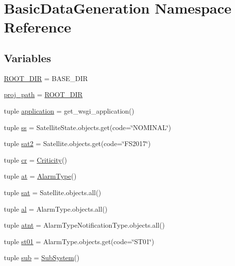 \hypertarget{namespace_basic_data_generation}{}\section{Basic\+Data\+Generation Namespace Reference}
\label{namespace_basic_data_generation}
\subsection*{Variables}
\begin{DoxyCompactItemize}
\item 
\hyperlink{namespace_basic_data_generation_ac7a32de6b13ab8024bb25d34167992a2}{R\+O\+O\+T\+\_\+\+D\+I\+R} = B\+A\+S\+E\+\_\+\+D\+I\+R
\item 
\hyperlink{namespace_basic_data_generation_aba88e6c9fac18290407d6547357b533f}{proj\+\_\+path} = \hyperlink{namespace_basic_data_generation_ac7a32de6b13ab8024bb25d34167992a2}{R\+O\+O\+T\+\_\+\+D\+I\+R}
\item 
tuple \hyperlink{namespace_basic_data_generation_ae5f818e308cadb95df893ff136a20bb1}{application} = get\+\_\+wsgi\+\_\+application()
\item 
tuple \hyperlink{namespace_basic_data_generation_a9429db321b2f5b7b76b129c7cedc9631}{ss} = Satellite\+State.\+objects.\+get(code=\char`\"{}N\+O\+M\+I\+N\+A\+L\char`\"{})
\item 
tuple \hyperlink{namespace_basic_data_generation_a2a7c0a3f11368b069b40d2b26ddfbba5}{sat2} = Satellite.\+objects.\+get(code=\char`\"{}F\+S2017\char`\"{})
\item 
tuple \hyperlink{namespace_basic_data_generation_a92305bfb85f8c33498e7deec34b189f8}{cr} = \hyperlink{class_ground_segment_1_1models_1_1_alarm_1_1_criticity_1_1_criticity}{Criticity}()
\item 
tuple \hyperlink{namespace_basic_data_generation_a30af2a92704198b0c3b54ac635fa46e8}{at} = \hyperlink{class_ground_segment_1_1models_1_1_alarm_1_1_alarm_type_1_1_alarm_type}{Alarm\+Type}()
\item 
tuple \hyperlink{namespace_basic_data_generation_a003ba5cfa9eb1da86b562dac92f713e3}{sat} = Satellite.\+objects.\+all()
\item 
tuple \hyperlink{namespace_basic_data_generation_a5e76cdcb4d6408f8d15fabc84d4c29aa}{al} = Alarm\+Type.\+objects.\+all()
\item 
tuple \hyperlink{namespace_basic_data_generation_a9bbccf8a803bc653ecc2dde0c79ce638}{atnt} = Alarm\+Type\+Notification\+Type.\+objects.\+all()
\item 
tuple \hyperlink{namespace_basic_data_generation_a51c41b982f7370bb0c9037d6d1e60464}{st01} = Alarm\+Type.\+objects.\+get(code=\char`\"{}S\+T01\char`\"{})
\item 
tuple \hyperlink{namespace_basic_data_generation_a50c64aa781e6b18a68c7db9a296e539d}{sub} = \hyperlink{class_ground_segment_1_1models_1_1_sub_system_1_1_sub_system}{Sub\+System}()
\end{DoxyCompactItemize}


